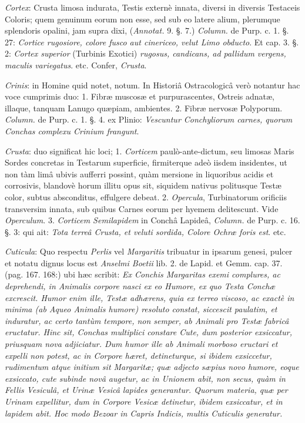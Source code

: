 \documentclass[a4paper, 11pt, oneside, polutonikogreek, german]{article}
\begin{document}
\emph{Cortex}: Crusta limosa indurata, Testis externè innata, diversi in diversis Testaceis Coloris; quem genuinum eorum non esse, sed sub eo latere alium, plerumque splendoris opalini, jam supra dixi, (\emph{Annotat.} 9. §. 7.) \emph{Column.} de Purp. c. 1. §. 27: \emph{Cortice rugosiore, colore fusco aut cinericeo, velut Limo obducto}. Et cap. 3. §. 2: \emph{Cortex superior} (Turbinis Exotici) \emph{rugosus, candicans, ad pallidum vergens, maculis variegatus}. etc. Confer, \emph{Crusta}.

\emph{Crinis}: in Homine quid notet, notum. In Historiâ Ostracologicâ verò notantur hac voce cumprimis duo: 1. Fibræ muscosæ et purpurascentes, Ostreis adnatæ, illaque, tanquam Lanugo quæpiam, ambientes. 2. Fibræ nervosæ Polyporum. \emph{Column.} de Purp. c. 1. §. 4. ex Plinio: \emph{Vescuntur Conchyliorum carnes, quorum Conchas complexu Crinium frangunt}.

\emph{Crusta}: duo significat hic loci; 1. \emph{Corticem} paulò-ante-dictum, seu limosas Maris Sordes concretas in Testarum superficie, firmiterque adeò iisdem insidentes, ut non tàm limâ ubivis aufferri possint, quàm mersione in liquoribus acidis et corrosivis, blandovè horum illitu opus sit, siquidem nativus politusque Testæ color, subtus absconditus, effulgere debeat. 2. \emph{Opercula}, Turbinatorum orificiis transversim innata, sub quibus Carnes eorum per hyemem delitescunt. Vide \emph{Operculum}. 3. \emph{Corticem Semilapidem} in Conchâ Lapideâ, \emph{Column.} de Purp. c. 16. §. 3: qui ait: \emph{Tota terreâ Crusta, et veluti sordida, Colore Ochræ foris est}. etc.

\emph{Cuticula}: Quo respectu \emph{Perlis} vel \emph{Margaritis} tribuatur in ipsarum genesi, pulcer et notatu dignus locus est \emph{Anselmi Boetii} lib. 2. de Lapid. et Gemm. cap. 37. (pag. 167. 168:) ubi hæc scribit: \emph{Ex Conchis Margaritas exemi complures, ac deprehendi, in Animalis corpore nasci ex eo Humore, ex quo Testa Conchæ excrescit. Humor enim ille, Testæ adhærens, quia ex terreo viscoso, ac exactè in minima (ab Aqueo Animalis humore) resoluto constat, siccescit paulatim, et induratur, ac certo tantùm tempore, non semper, ab Animali pro Testæ fabricâ eructatur. Hinc sit, Conchas multiplici constare Cute, dum posterior exsiccatur, priusquam nova adjiciatur. Dum humor ille ab Animali morboso eructari et expelli non potest, ac in Corpore hæret, detineturque, si ibidem exsiccetur, rudimentum atque initium sit Margaritæ; quæ adjecto sæpius novo humore, eoque exsiccato, cute subinde novâ augetur, ac in Unionem abit, non secus, quàm in Fellis Vesiculâ, et Urinæ Vesicâ lapides generantur. Quorum materia, quæ per Urinam expellitur, dum in Corpore Vesicæ detinetur, ibidem exsiccatur, et in lapidem abit. Hoc modo Bezoar in Capris Indicis, multis Cuticulis generatur.}
\end{document}
